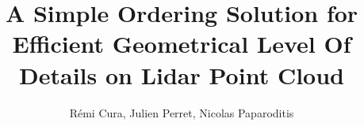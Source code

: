 
	

\title{ A Simple Ordering Solution for Efficient Geometrical Level Of Details on Lidar Point Cloud}
\author{R\'emi Cura, Julien Perret, Nicolas Paparoditis}



\maketitle
\newpage
 


	

	

	
	
	

	

	

